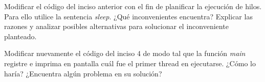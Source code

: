 \begin{questions}

\question Modificar el código del inciso anterior con el fin de planificar la ejecución de hilos. Para ello utilice la sentencia \textit{sleep}. ¿Qué inconvenientes encuentra? Explicar las razones y analizar posibles alternativas para solucionar el inconveniente planteado.

\question Modificar nuevamente el código del inciso 4 de modo tal que la función \textit{main} registre e imprima en pantalla cuál fue el primer thread en ejecutarse. ¿Cómo lo haría? ¿Encuentra algún problema en su solución?

\end{questions}
